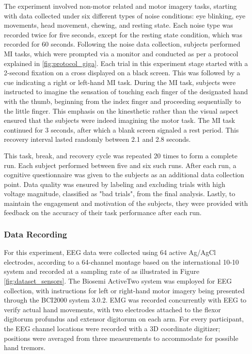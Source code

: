 The experiment involved non-motor related and motor imagery tasks, starting with data collected under six different types of noise conditions: eye blinking, eye movements, head movement, chewing, and resting state. Each noise type was recorded twice for five seconds, except for the resting state condition, which was recorded for 60 seconds. Following the noise data collection, subjects performed MI tasks, which were prompted via a monitor and conducted as per a protocol explained in \cref{fig:protocol_giga}. Each trial in this experiment stage started with a 2-second fixation on a cross displayed on a black screen. This was followed by a cue indicating a right or left-hand MI task. During the MI task, subjects were instructed to imagine the sensation of touching each finger of the designated hand with the thumb, beginning from the index finger and proceeding sequentially to the little finger. This emphasis on the kinesthetic rather than the visual aspect ensured that the subjects were indeed imagining the motor task. The MI task continued for 3 seconds, after which a blank screen signaled a rest period. This recovery interval lasted randomly between 2.1 and 2.8 seconds.

This task, break, and recovery cycle was repeated 20 times to form a complete run. Each subject performed between five and six such runs. After each run, a cognitive questionnaire was given to the subjects as an additional data collection point. Data quality was ensured by labeling and excluding trials with high voltage magnitude, classified as "bad trials", from the final analysis. Lastly, to maintain the engagement and motivation of the subjects, they were provided with feedback on the accuracy of their task performance after each run.



\subsubsection{Data Recording}

For this experiment, EEG data were collected using 64 active Ag/AgCl electrodes, according to a 64-channel montage based on the international 10-10 system and recorded at a sampling rate of  as illustrated in Figure \ref{fig:dataset_sensors}. The Biosemi ActiveTwo system was employed for EEG collection, with instructions for left or right-hand motor imagery being presented through the BCI2000 system 3.0.2. EMG was recorded concurrently with EEG to verify actual hand movements, with two electrodes attached to the flexor digitorum profundus and extensor digitorum on each arm. For every participant, the EEG channel locations were recorded with a 3D coordinate digitizer; positions were averaged from three measurements to accommodate for possible hand tremors.

